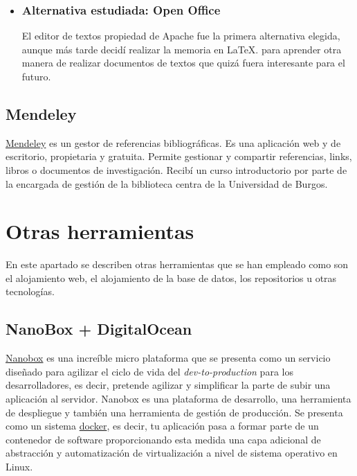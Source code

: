  \begin{itemize}
 	\item 	\subsubsection{Alternativa estudiada: Open Office}\label{openoffice}
El editor de textos propiedad de Apache fue la primera alternativa elegida, aunque más tarde decidí realizar la memoria en La\TeX. para aprender otra manera de realizar documentos de textos que quizá fuera interesante para el futuro.
\end{itemize}

 \subsection{Mendeley}\label{docs_mendeley}
  \href{https://www.mendeley.com/}{Mendeley} es un gestor de referencias bibliográficas. Es una aplicación web y de escritorio, propietaria y gratuita. Permite gestionar y compartir referencias, links, libros o documentos de investigación. Recibí un curso introductorio por parte de la encargada  de gestión de la biblioteca centra de la Universidad de Burgos.
  
  \section{Otras herramientas}\label{otrasherramientas}
En este apartado se describen otras herramientas que se han empleado como son el alojamiento web, el alojamiento de la base de datos, los repositorios u otras tecnologías.

 \subsection{NanoBox + DigitalOcean}
\href{https://nanobox.io/}{Nanobox}  es una increíble micro plataforma  que se presenta como un servicio diseñado para agilizar el ciclo de vida del \emph{dev-to-production} para los desarrolladores, es decir, pretende agilizar y simplificar la parte de subir una aplicación al servidor. Nanobox es una plataforma de desarrollo, una herramienta de despliegue y también una herramienta de gestión de producción. Se presenta como un sistema \href{https://es.wikipedia.org/wiki/Docker_(software)}{docker}, es decir, tu aplicación pasa a formar parte de un contenedor de software proporcionando esta medida una capa adicional de abstracción y automatización de virtualización a nivel de sistema operativo en Linux. 

